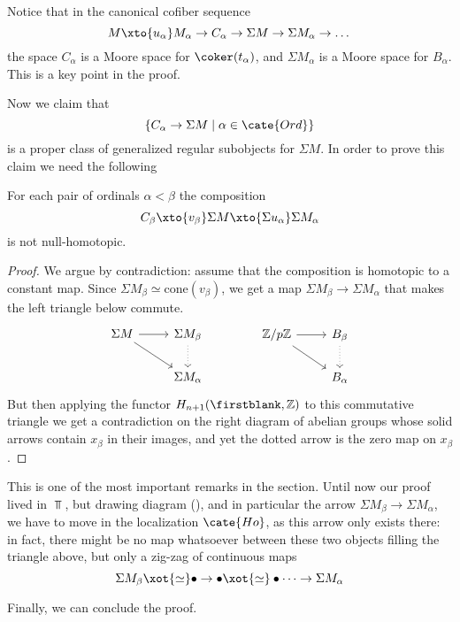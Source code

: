 \begin{remark}
Notice that in the canonical cofiber sequence
\[
M \xto{u_\alpha} M_\alpha \to C_\alpha \to \Sigma M \to \Sigma M_\alpha\to\dots
\]
the space $C_\alpha$ is a Moore space for $\coker(t_\alpha)$, and $\Sigma M_\alpha$ is a Moore space for $B_\alpha$. This is a key point in the proof.
\end{remark}
Now we claim that 
\[
\{C_{\alpha} \to \Sigma M \mid \alpha \in \cate{Ord}\}
\] is a proper class of generalized regular subobjects for $\Sigma M$. In order to prove this claim we need the following
\begin{proposition}
\label{key}
For each pair of ordinals $\alpha < \beta$ the composition
\[
C_\beta \xto{v_\beta} \Sigma M \xto{\Sigma u_{\alpha}} \Sigma M_\alpha
\]
is not null-homotopic.
\end{proposition}
\begin{proof}
We argue by contradiction: assume that the composition is homotopic to a constant map. Since $\Sigma M_\beta \simeq \text{cone}(v_\beta)$, we get a map $\Sigma M_\beta \to \Sigma M_\alpha$ that makes the left triangle below commute.
\[\label{the-diag}
\begin{tikzcd}
\Sigma M \ar[r]\ar[dr]& \Sigma M_\beta \ar[dotted, d]\\
& \Sigma M_\alpha
\end{tikzcd}
\qquad\qquad
\begin{tikzcd}
\mathbb{Z}/p\mathbb{Z} \ar[r]\ar[dr]& B_\beta \ar[dotted, d]\\
& B_\alpha
\end{tikzcd}
\]
But then applying the functor $H_{n+1}(\firstblank, \mathbb{Z})$ to this commutative triangle we get a contradiction on the right diagram of abelian groups whose solid arrows contain $x_\beta$ in their images, and yet the dotted arrow is the zero map on $x_\beta$.
\end{proof}
\begin{remark}
This is one of the most important remarks in the section. Until now our proof lived in $\Top$, but drawing diagram (), and in particular the arrow $\Sigma M_\beta \to \Sigma M_\alpha$, we have to move in the localization $\cate{Ho}$, as this arrow only exists there: in fact, there might be no map whatsoever between these two objects filling the triangle above, but only a zig-zag of continuous maps
\[
\Sigma M_\beta \xot{\simeq} \bullet \to \bullet \xot{\simeq} \bullet \dots \to \Sigma M_\alpha
\]
\end{remark}
Finally, we can conclude the proof.

